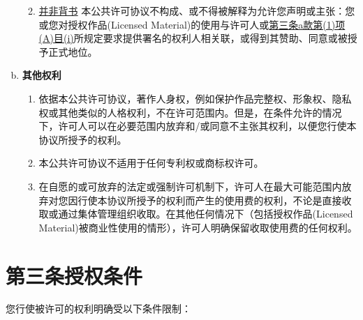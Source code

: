 \begin{enumerate}[a.]
\begin{enumerate}[1.]
\begin{enumerate}[A.]
        \end{enumerate}
        \item \underline{并非背书} 本公共许可协议不构成、或不得被解释为允许您声明或主张：您或您对授权作品(Licensed Material)的使用与许可人或\hyperref[entry:A.3.a.1.A.i]{第三条a款第(1)项(A)目(i)}所规定要求提供署名的权利人相关联，或得到其赞助、同意或被授予正式地位。\label{entry:A.2.a.6}
    \end{enumerate}
    \item \textbf{其他权利} \label{entry:A.2.b}
    \begin{enumerate}[1.]
        \item 依据本公共许可协议，著作人身权，例如保护作品完整权、形象权、隐私权或其他类似的人格权利，不在许可范围内。但是，在条件允许的情况下，许可人可以在必要范围内放弃和/或同意不主张其权利，以便您行使本协议所授予的权利。\label{entry:A.2.b.1}
        \item 本公共许可协议不适用于任何专利权或商标权许可。\label{entry:A.2.b.2}
        \item 在自愿的或可放弃的法定或强制许可机制下，许可人在最大可能范围内放弃对您因行使本协议所授予的权利而产生的使用费的权利，不论是直接收取或通过集体管理组织收取。在其他任何情况下（包括授权作品(Licensed Material)被商业性使用的情形），许可人明确保留收取使用费的任何权利。\label{entry:A.2.b.3}
    \end{enumerate}
\end{enumerate}

\section*{第三条\;授权条件} \label{section:A.3}

您行使被许可的权利明确受以下条件限制：


